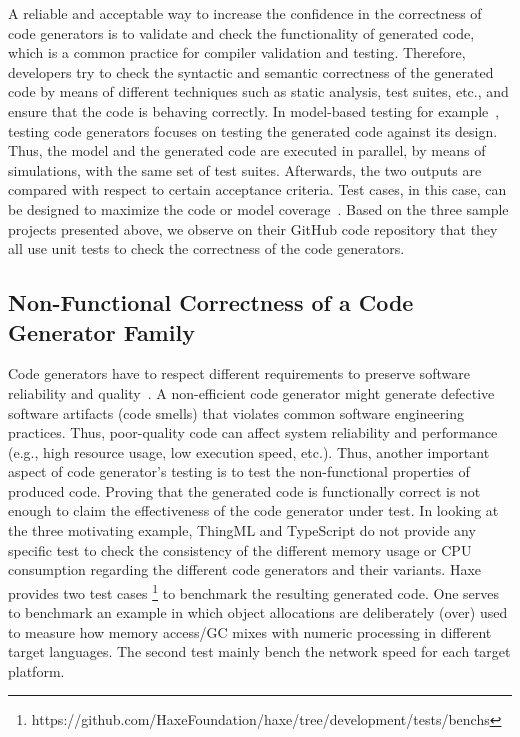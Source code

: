 A reliable and acceptable way to increase the confidence in the correctness of code generators is to validate and check the functionality of generated code, which is a common practice for compiler validation and testing.
Therefore, developers try to check the syntactic and semantic correctness of the generated code by means of different techniques such as static analysis, test suites, etc., and ensure that the code is behaving correctly.  In model-based testing for example~\cite{jorges2014back,stuermer2007systematic}, testing code generators focuses on testing the generated code against its design. Thus, the model and the generated code are executed in parallel, by means of simulations, with the same set of test suites. Afterwards, the two outputs are compared with respect to certain acceptance criteria. Test cases, in this case, can be designed to maximize the code or model coverage~\cite{sturmer2005overview}. 
Based on the three sample projects presented above, we observe on their GitHub code repository that they all use unit tests to check the correctness of the code generators.  

\subsection{Non-Functional Correctness of a Code Generator Family}


Code generators have to respect different requirements to preserve software reliability and quality~\cite{demertzi2011analyzing}. A non-efficient code generator might generate defective software artifacts (code smells) that violates common software engineering practices. Thus, poor-quality code can affect system reliability and performance (e.g., high resource usage, low execution speed, etc.). Thus, another important aspect of code generator's testing is to test the non-functional properties of produced code. Proving that the generated code is functionally correct is not enough to claim the effectiveness of the code generator under test. In looking at the three motivating example, ThingML and TypeScript do not provide any specific test to check the consistency of the different memory usage or CPU consumption regarding the different code generators and their variants. Haxe provides two test cases \footnote{https://github.com/HaxeFoundation/haxe/tree/development/tests/benchs} to benchmark the resulting generated code. One serves to benchmark an example in which object allocations are deliberately (over) used to measure how memory access/GC mixes with numeric processing in different target languages. The second test mainly bench the network speed for each target platform. 

